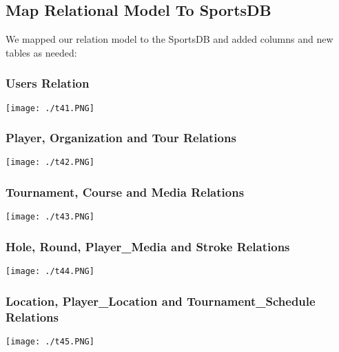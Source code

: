 \documentclass[titlepage]{article}
\begin{document}
\vspace{0.5em}

\subsection{Map Relational Model To SportsDB}

We mapped our relation model to the SportsDB and added columns and new tables as needed:

\vspace{1em}
\subsubsection{Users Relation}
\vspace{2pt}
\begin{center}
\texttt{[image: ./t41.PNG]}
\end{center}

\vspace{1em}
\subsubsection{Player, Organization and Tour Relations}
\vspace{2pt}
\begin{center}
\texttt{[image: ./t42.PNG]}
\end{center}

\vspace{1em}
\subsubsection{Tournament, Course and Media Relations}
\vspace{2pt}
\begin{center}
\texttt{[image: ./t43.PNG]}
\end{center}

\vspace{1em}
\subsubsection{Hole, Round, Player\_Media and Stroke Relations}
\vspace{2pt}
\begin{center}
\texttt{[image: ./t44.PNG]}
\end{center}

\vspace{1em}
\subsubsection{Location, Player\_Location and Tournament\_Schedule Relations}
\vspace{2pt}
\begin{center}
\texttt{[image: ./t45.PNG]}
\end{center}
\end{document}
